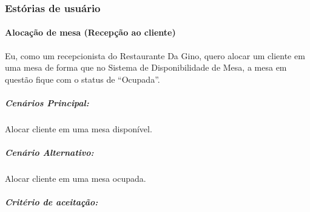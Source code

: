 \subsubsection{Estórias de usuário}

\paragraph{Alocação de mesa (Recepção ao cliente)}

Eu, como um recepcionista do Restaurante Da Gino, quero alocar um cliente em uma mesa de forma que no Sistema de Disponibilidade de Mesa, a mesa em questão fique com o status de “Ocupada”.

\subparagraph{Cenários Principal:}

Alocar cliente em uma mesa disponível.

\subparagraph{Cenário Alternativo:}

Alocar cliente em uma mesa ocupada.

\subparagraph{Critério de aceitação:}

